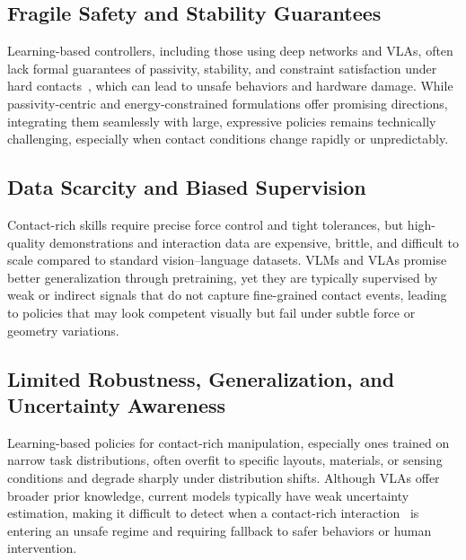 \documentclass[Afour,sageh,times]{template/sagej}
\begin{document}
    \subsection{Fragile Safety and Stability Guarantees}
    Learning-based controllers, including those using deep networks and VLAs, often lack formal guarantees of passivity, stability, and constraint satisfaction under hard contacts~\citep{zhang2025passivity, spyrakos2020passivity,75}, which can lead to unsafe behaviors and hardware damage. While passivity-centric and energy-constrained formulations offer promising directions, integrating them seamlessly with large, expressive policies remains technically challenging, especially when contact conditions change rapidly or unpredictably.
    \subsection{Data Scarcity and Biased Supervision}
    Contact-rich skills require precise force control and tight tolerances, but high-quality demonstrations and interaction data are expensive, brittle, and difficult to scale compared to standard vision–language datasets. VLMs and VLAs promise better generalization through pretraining, yet they are typically supervised by weak or indirect signals that do not capture fine-grained contact events, leading to policies that may look competent visually but fail under subtle force or geometry variations.
    \subsection{Limited Robustness, Generalization, and Uncertainty Awareness}
    Learning-based policies for contact-rich manipulation, especially ones trained on narrow task distributions, often overfit to specific layouts, materials, or sensing conditions and degrade sharply under distribution shifts. Although VLAs offer broader prior knowledge, current models typically have weak uncertainty estimation, making it difficult to detect when a contact-rich interaction~\cite{33,369} is entering an unsafe regime and requiring fallback to safer behaviors or human intervention.
    
    
\end{document}
